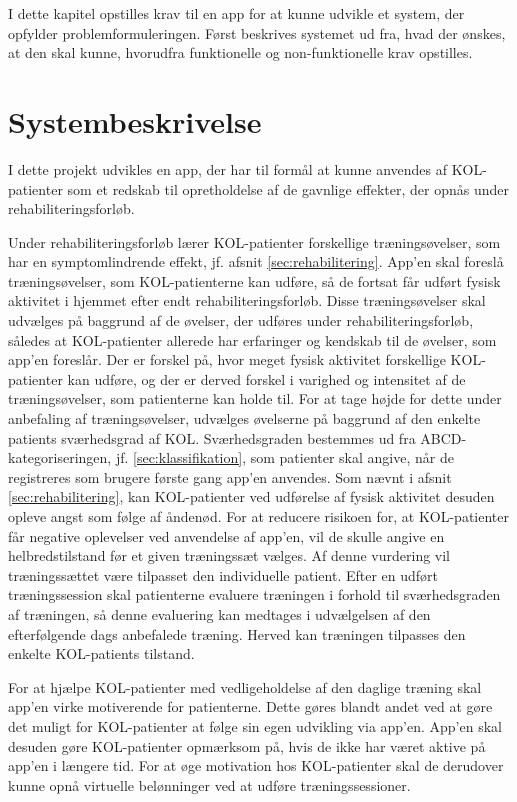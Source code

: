 I dette kapitel opstilles krav til en app for at kunne udvikle et system, der opfylder problemformuleringen. Først beskrives systemet ud fra, hvad der ønskes, at den skal kunne, hvorudfra funktionelle og non-funktionelle krav opstilles.

\section{Systembeskrivelse} \label{sec:systembeskrivelse}
I dette projekt udvikles en app, der har til formål at kunne anvendes af KOL-patienter som et redskab til opretholdelse af de gavnlige effekter, der opnås under rehabiliteringsforløb.

Under rehabiliteringsforløb lærer KOL-patienter forskellige træningsøvelser, som har en symptomlindrende effekt, jf. afsnit \ref{sec:rehabilitering}. App’en skal foreslå træningsøvelser, som KOL-patienterne kan udføre, så de fortsat får udført fysisk aktivitet i hjemmet efter endt rehabiliteringsforløb. Disse træningsøvelser skal udvælges på baggrund af de øvelser, der udføres under rehabiliteringsforløb, således at KOL-patienter allerede har erfaringer og kendskab til de øvelser, som app’en foreslår.
Der er forskel på, hvor meget fysisk aktivitet forskellige KOL-patienter kan udføre, og der er derved forskel i varighed og intensitet af de træningsøvelser, som patienterne kan holde til. For at tage højde for dette under anbefaling af træningsøvelser, udvælges øvelserne på baggrund af den enkelte patients sværhedsgrad af KOL. Sværhedsgraden bestemmes ud fra ABCD-kategoriseringen, jf. \ref{sec:klassifikation}, som patienter skal angive, når de registreres som brugere første gang app'en anvendes. Som nævnt i afsnit \ref{sec:rehabilitering}, kan KOL-patienter ved udførelse af fysisk aktivitet desuden opleve angst som følge af åndenød. For at reducere risikoen for, at KOL-patienter får negative oplevelser ved anvendelse af app’en, vil de skulle angive en helbredstilstand før et given træningssæt vælges. Af denne vurdering vil træningssættet være tilpasset den individuelle patient. 
Efter en udført træningssession skal patienterne evaluere træningen i forhold til sværhedsgraden af træningen, så denne evaluering kan medtages i udvælgelsen af den efterfølgende dags anbefalede træning. Herved kan træningen tilpasses den enkelte KOL-patients tilstand.

For at hjælpe KOL-patienter med vedligeholdelse af den daglige træning skal app’en virke motiverende for patienterne. Dette gøres blandt andet ved at gøre det muligt for KOL-patienter at følge sin egen udvikling via app’en. App’en skal desuden gøre KOL-patienter opmærksom på, hvis de ikke har været aktive på app'en i længere tid. For at øge motivation hos KOL-patienter skal de derudover kunne opnå virtuelle belønninger ved at udføre træningssessioner.

